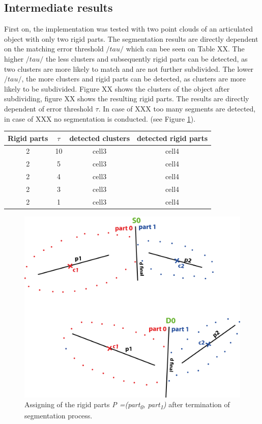 \documentclass[a4paper,english,11pt]{report}
\begin{document}
\subsection{Intermediate results}

First on, the implementation was tested with two point clouds of an articulated object with only two rigid parts. The segmentation results are directly dependent on the matching error threshold $/tau/$ which can bee seen on Table XX. The higher $/tau/$ the less clusters and subsequently rigid parts can be detected, as two clusters are more likely to match and are not further subdivided. The lower $/tau/$, the more clusters and rigid parts can be detected, as clusters are more likely to be subdivided. Figure XX shows the clusters of the object after subdividing, figure XX shows the resulting rigid parts. The results are directly dependent of error threshold $\tau$. In case of XXX too many segments are detected, in case of XXX no segmentation is conducted. (see Figure \ref{fig:dc_results_2p}). 

\begin{center}
	\begin{tabular}{ |c|c|c|c| } 
		\hline
		Rigid parts & $\tau$ & detected clusters & detected rigid parts \\
		\hline
		2 & 10 & cell3 & cell4 \\ 
		2 & 5 & cell3 & cell4 \\
		2 & 4 & cell3 & cell4 \\
		2 & 3 & cell3 & cell4 \\
		2 & 1 & cell3 & cell4 \\
		\hline
	\end{tabular}
\end{center}

\begin{figure}
	\centering
	\includegraphics[width=0.7\linewidth]{illustration_results}
	\caption{Assigning of the rigid parts \textit{P =(part\textsubscript{0}, part\textsubscript{1})} after termination of segmentation process.}
	\label{fig:dc_results_2p}
\end{figure}
\end{document}
